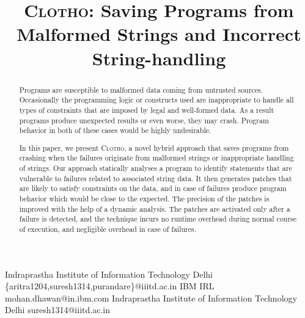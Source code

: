 \documentclass[pldi]{sigplanconf}
\def\tool{\textsc{Clotho}\xspace}
\def\papertitle{\tool: Saving Programs from Malformed Strings and Incorrect
String-handling}
\begin{document}
\title{\Large \bf \papertitle}

 {Indraprastha Institute of Information Technology Delhi}
 {\{aritra1204,suresh1314,purandare\}@iiitd.ac.in}
 {IBM IRL}
 {mohan.dhawan@in.ibm.com}
 {Indraprastha Institute of Information Technology Delhi}
 {suresh1314@iiitd.ac.in}

\maketitle



\begin{abstract}
\small


Programs are susceptible to malformed data coming from untrusted sources.
Occasionally the programming logic or constructs used are inappropriate to
handle all types of constraints that are imposed by legal and well-formed data.
As a result programs produce unexpected results or even worse, they may crash.
Program behavior in both of these cases would be highly undesirable.

In this paper, we present \tool, a novel hybrid approach that saves programs
from crashing when the failures originate from malformed strings or
inappropriate handling of strings. Our approach statically analyses a program to
identify statements that are vulnerable to failures related to associated string
data. It then generates patches that are likely to satisfy constraints on the
data, and in case of failures produce program behavior which would be close to
the expected. The precision of the patches is improved with the help of a
dynamic analysis. The patches are activated only after a failure is detected,
and the technique incurs no runtime overhead during normal course of execution,
and negligible overhead in case of failures.


\end{abstract}
\end{document}
